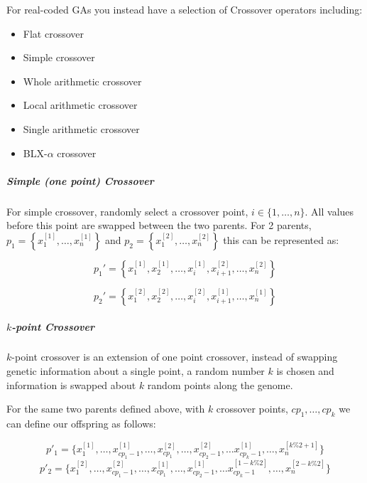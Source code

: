 For real-coded GAs you instead have a selection of Crossover operators including:

\begin{itemize}
    \item Flat crossover
    \item Simple crossover
    \item Whole arithmetic crossover
    \item Local arithmetic crossover
    \item Single arithmetic crossover
    \item BLX-$\alpha$ crossover
\end{itemize}


\subparagraph{Simple (one point) Crossover}\label{imp:SimpCross}

For simple crossover, randomly select a crossover point, $i \in \{1,\ldots,n \}$. All values before this point are swapped between the two parents. For 2 parents, $p_1 = \left\{ x_1^{[1]},\ldots,x_n^{[1]}\right\}$ and $p_2 = \left\{ x_1^{[2]},\ldots,x_n^{[2]}\right\}$ this can be represented as:

\begin{equation}
    p_1' = \left\{ x_1^{[1]},x_2^{[1]}, \ldots, x_i^{[1]}, x_{i+1}^{[2]},\ldots, x_n^{[2]} \right\} 
\end{equation}

\begin{equation}
    p_2' = \left\{ x_1^{[2]},x_2^{[2]}, \ldots, x_i^{[2]}, x_{i+1}^{[1]},\ldots, x_n^{[1]} \right\}
  \end{equation}

  \subparagraph{$k$-point Crossover}

  $k$-point crossover is an extension of one point crossover, instead of swapping genetic information about a single point, a random number $k$ is chosen and information is swapped about $k$ random points along the genome.

  For the same two parents defined above, with $k$ crossover points, $cp_{1},\ldots,cp_{k}$ we can define our offspring as follows:

  \begin{equation}
    p'_{1} = \{ x_{1}^{[1]},\ldots,x^{[1]}_{cp_{1}-1},\ldots,x_{cp_{1}}^{[2]},\ldots,x_{cp_{2}-1}^{[2]},\ldots x_{cp_{k}-1}^{[1]},\ldots, x_{n}^{[k\%2+1]}\}
  \end{equation}
  \begin{equation}
    p'_{2} = \{ x_{1}^{[2]},\ldots,x^{[2]}_{cp_{1}-1},\ldots,x_{cp_{1}}^{[1]},\ldots,x_{cp_{2}-1}^{[1]},\ldots x_{cp_{k}-1}^{[1-k\%2]},\ldots, x_{n}^{[2-k\%2]}\}
  \end{equation}

